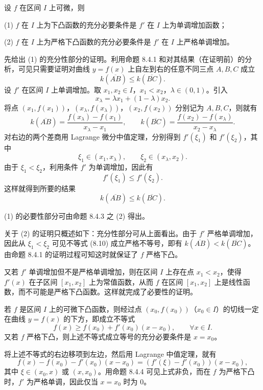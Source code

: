 \begin{xtheorem}[8.4.4]
设 $f$ 在区间 $I$ 上可微，则

(1) $f$ 在 $I$ 上为下凸函数的充分必要条件是 $f'$ 在 $I$ 上为单调增加函数；

(2) $f$ 在 $I$ 上为严格下凸函数的充分必要条件是 $f'$ 在 $I$ 上严格单调增加。
\end{xtheorem}
\begin{xproof}
先给出 (1) 的充分性部分的证明。利用命题 8.4.1 和对其结果（在证明前）的分析，可见只需要证明对曲线 $y=f(x)$ 上自左到右的任意不同三点 $A,B,C$ 成立
\[
  k(\overline{AB})\le k(\overline{BC}).
\]
设 $f'$ 在区间 $I$ 上单调增加。取 $x_1,x_2\in I$，$x_1<x_2$，$\lambda\in(0,1)$。引入
\[
  x_\lambda=\lambda x_1+(1-\lambda)x_2.
\]
将点 $(x_1,f(x_1))$，$(x_\lambda,f(x_\lambda))$，$(x_2,f(x_2))$ 分别记为 $A,B,C$，则就有
\[
  k(\overline{AB})=\frac{f(x_\lambda)-f(x_1)}{x_\lambda-x_1},
  \qquad
  k(\overline{BC})=\frac{f(x_2)-f(x_\lambda)}{x_2-x_\lambda}.
\]
对右边的两个差商用 Lagrange 微分中值定理，分别得到 $f'(\xi_1)$ 和 $f'(\xi_2)$，其中
\[
  \xi_1\in(x_1,x_\lambda),\qquad \xi_2\in(x_\lambda,x_2).
\]
由于 $\xi_1<\xi_2$，利用条件 $f'$ 为单调增加，因此有
\begin{equation}
  f'(\xi_1)\le f'(\xi_2).
  \tag{8.10}
  \label{eq:8.10}
\end{equation}
这样就得到所要的结果
\[
  k(\overline{AB})\le k(\overline{BC}).
\]

(1) 的必要性部分可由命题 8.4.3 之 (2) 得出。

关于 (2) 的证明只概述如下：充分性部分可从上面看出。由于 $f'$ 严格单调增加，因此从 $\xi_1<\xi_2$ 可见不等式 (8.10) 成立严格不等号，即有 $k(\overline{AB})<k(\overline{BC})$。由命题 8.4.1 的证明过程可知这时就保证了 $f$ 严格下凸。

又若 $f'$ 单调增加但不是严格单调增加，则在区间 $I$ 上存在点 $x_1<x_2$，使得 $f'(x)$ 在子区间 $[x_1,x_2]$ 上为常值函数，从而 $f$ 在区间 $[x_1,x_2]$ 上是线性函数，而不可能是严格下凸函数。这样就完成了必要性的证明。
\end{xproof}

\begin{xtheorem}[8.4.5]
若 $f$ 是区间 $I$ 上的可微下凸函数，则经过点 $(x_0,f(x_0))$（$x_0\in I$）的切线一定在曲线 $y=f(x)$ 的下方，即成立不等式
\[
  f(x)\ge f(x_0)+f'(x_0)(x-x_0),\qquad\forall x\in I.
\]
又若 $f$ 严格下凸，则上述不等式成立等号的充分必要条件是 $x=x_0$。
\end{xtheorem}
\begin{xproof}
将上述不等式的右边移项到左边，然后用 Lagrange 中值定理，就有
\[
  f(x)-f(x_0)-f'(x_0)(x-x_0)=(f'(\xi)-f'(x_0))(x-x_0),
\]
其中 $\xi\in(x_0,x)$ 或 $(x,x_0)$。用命题 8.4.4 可见上式非负，而在 $f$ 为严格下凸时，$f'$ 为严格单调，因此仅当 $x=x_0$ 时为 0。
\end{xproof}


